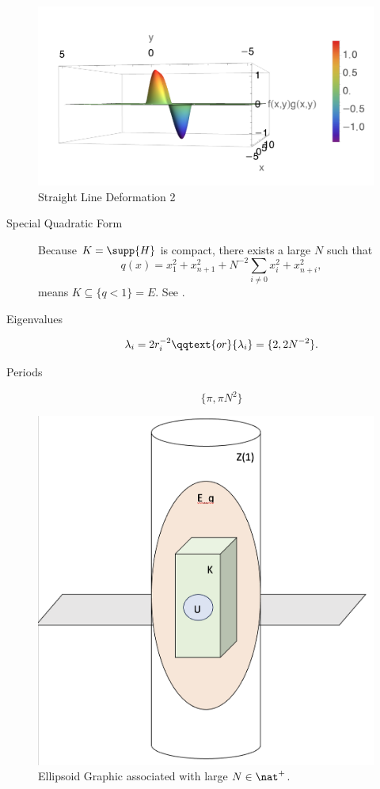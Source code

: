 \documentclass[../main-v2-manifolds.tex]{subfiles}
\begin{document}
\begin{figure}[h!]
    \centering
    \includegraphics[width=1.1\linewidth]{images/straight-line-deformation-2.png}
    \caption{Straight Line Deformation 2}
    \label{fig:straight-line-deform 2}
\end{figure}
\clearpage
{}
\begin{description}
    \item[Special Quadratic Form]
    Because $K = \supp{H}$ is compact, there exists a large $N$ such that 
\[
    q(x) = x_1^2 + x_{n+1}^2 + N^{-2}\sum_{i\neq 0}x_i^2 + x_{n+i}^2,
\]
means $K\subseteq \{q<1\} = E$. See .
\item[Eigenvalues] 
\[
    \lambda_i = 2r_i^{-2} \qqtext{or}\{\lambda_i\} = \{2,2N^{-2}\}.
\]
\item[Periods] 
\[\{\pi,\pi N^2\}\]
\end{description}
\begin{figure}[h!]
    \centering
    \includegraphics[width=0.5\linewidth]{images/engulfing-ellipsoid-ppt-graphic.png}
    \caption{Ellipsoid Graphic associated with large $N\in\nat^+$.}
    \label{fig:engulfing-ellipsoid}
\end{figure}
\end{document}
